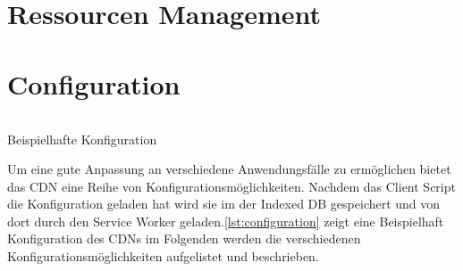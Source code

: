 
\section{Ressourcen Management}



\section{Configuration}
\begin{listing}[h]
	\inputminted{javascript}{listings/configuration.js}
	\caption{Beispielhafte Konfiguration}
	\label{lst:configuration}
\end{listing}

Um eine gute Anpassung an verschiedene Anwendungsfälle zu ermöglichen bietet das \pTp CDN eine Reihe von Konfigurationsmöglichkeiten. Nachdem das Client Script die Konfiguration geladen hat wird sie im der Indexed DB gespeichert und von dort durch den Service Worker geladen.\ref{lst:configuration} zeigt eine Beispielhaft Konfiguration des CDNs im Folgenden werden die verschiedenen Konfigurationsmöglichkeiten aufgelistet und beschrieben.


